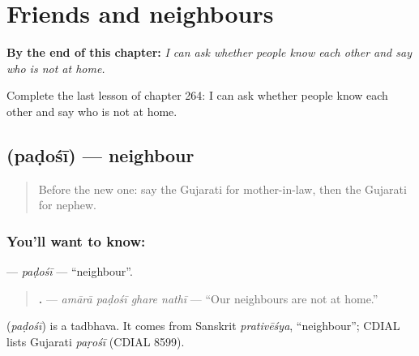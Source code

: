 
\chapter{Friends and neighbours}
\label{ch:gu-friends-and-neighbours}

\begin{chapteropening}
\textbf{By the end of this chapter:} \emph{I can ask whether people know each other and say who is not at home.}

Complete the last lesson of chapter 264: I can ask whether people know each other and say who is not at home.
\end{chapteropening}

\section[\texorpdfstring{\gu{પડોશી} (paḍośī)}{પડોશી (paḍośī)}]{ (paḍośī) — neighbour}

\label{lesson:GU-C264-padoshi}



\begin{quote}
Before the new one: say the Gujarati for mother-in-law, then the Gujarati for nephew.
\end{quote}

\subsection*{You'll want to know: }
\textbf{} — \emph{paḍośī} — \textquotedblleft{}neighbour\textquotedblright{}.

\begin{quote}
\textbf{   .} — \emph{amārā paḍośī ghare nathī} — \textquotedblleft{}Our neighbours are not at home.\textquotedblright{}
\end{quote}

\begin{cousinweb}
\textbf{} (\emph{paḍośī}) is a tadbhava. It comes from Sanskrit \emph{prativēśya}, \textquotedblleft{}neighbour\textquotedblright{}; CDIAL lists Gujarati \emph{paṛośī} (CDIAL 8599).
\end{cousinweb}

